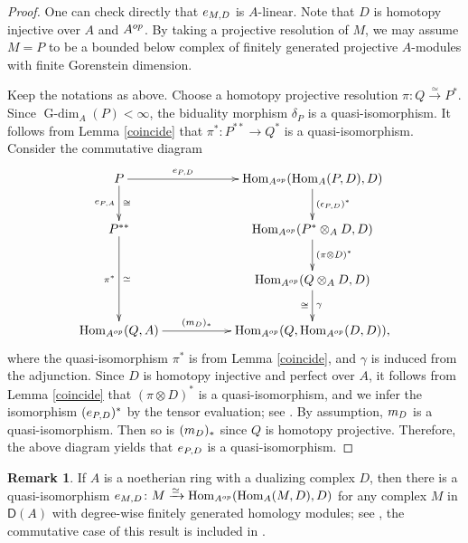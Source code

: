 \documentclass{amsart}
\newcommand{\D}{\mathsf{D}}
\newcommand{\0}{{\bf{0}}}
\DeclareMathOperator{\Gdim}{G-dim}
\DeclareMathOperator{\Hom}{Hom}
\theoremstyle{definition}
\newtheorem{remark}[theorem]{Remark}
\begin{document}
\begin{proof}
One can check directly that ${\rm e}_{M,D}$ is  $A$-linear. Note that $D$ is homotopy injective over $A$ and $A^{\rm op}$.
By taking a projective resolution of $M$, we may assume $M=P$ to be a bounded below complex of finitely generated projective  $A$-modules with finite Gorenstein dimension.

Keep the notations as above. Choose a homotopy projective resolution $\pi\colon Q\xrightarrow \simeq P^\ast$. Since $\Gdim_A(P)<\infty$, the biduality morphism $\delta_P$ is a quasi-isomorphism. It follows from Lemma \ref{coincide} that $\pi^\ast\colon P^{\ast\ast}\rightarrow Q^\ast$ is a quasi-isomorphism. Consider the commutative diagram
$$  \xymatrix{
    P\ar[rr]^-{{\rm e}_{P,D}}\ar[d]^-\cong_-{{\rm e}_{P,A}}& & \Hom_{A^{\rm op}}(\Hom_A(P,D),D)\ar[d]^-{(\epsilon_{P,D})^\ast}\\
    P^{\ast\ast}\ar[dd]_-{\pi^\ast}^-\simeq && \Hom_{A^{\rm op}}(P^\ast\otimes_A D,D)\ar[d]^-{(\pi\otimes D)^\ast}\\
  && \Hom_{A^{\rm op}}(Q\otimes_AD,D)\ar[d]^-\gamma_-\cong\\
    \Hom_{A^{\rm op}}(Q,A)\ar[rr]^-{({\rm m}_D)_\ast}& &\Hom_{A^{\rm op}}(Q,\Hom_{A^{\rm op}}(D,D)),
    }
$$
where the quasi-isomorphism $\pi^\ast$ is from Lemma \ref{coincide}, and $\gamma$ is induced from the adjunction. Since $D$ is homotopy injective and perfect over $A$, it follows from Lemma \ref{coincide} that $(\pi\otimes D)^\ast$ is a quasi-isomorphism, and we infer the isomorphism $({\rm e}_{P,D})^\ast$ by the tensor evaluation; see \cite[Theorem 4.5.10]{CFH}. By assumption, ${\rm m}_D$ is a quasi-isomorphism. Then so is $({\rm m}_D)_\ast$ since $Q$ is homotopy projective. Therefore, the above diagram yields that ${\rm e}_{P,D}$ is a quasi-isomorphism.
\end{proof}

\begin{remark}
If $A$ is a noetherian ring with a dualizing complex $D$, then there is a quasi-isomorphism
${\rm e}_{M,D} \colon M\xrightarrow \simeq \Hom_{A^{\rm op}}(\Hom_A(M,D),D)$ for any complex $M$ in $\D(A)$ with degree-wise finitely generated homology modules; see \cite[Theorem 10.1.23]{CFH}, the commutative case of this result is included in \cite[Chapter V, Proposition 2.1]{Hartshorne}.

\end{remark}
\end{document}
